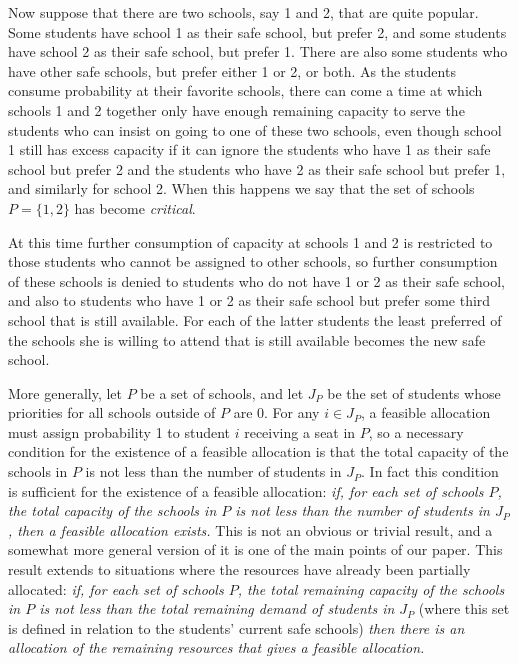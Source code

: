 \documentclass[12pt]{article}
\theoremstyle{definition}
\begin{document}
Now suppose that there are two schools, say 1 and 2, that are quite
popular.  Some students have school 1 as their safe school, but prefer
2, and some students have school 2 as their safe school, but prefer 1.
There are also some students who have other safe schools, but prefer
either 1 or 2, or both.  As the students consume probability at their
favorite schools, there can come a time at which schools 1 and 2
together only have enough remaining capacity to serve the students who
can insist on going to one of these two schools, even though school 1
still has excess capacity if it can ignore the students who have 1 as
their safe school but prefer 2 and the students who have 2 as their
safe school but prefer 1, and similarly for school 2.  When this
happens we say that the set of schools $P = \{1,2\}$ has become
\emph{critical}.

At this time further consumption of capacity at schools 1 and 2 is
restricted to those students who cannot be assigned to other schools,
so further consumption of these schools is denied to students who do
not have 1 or 2 as their safe school, and also to students who have 1
or 2 as their safe school but prefer some third school that is still
available.  For each of the latter students the least preferred of the
schools she is willing to attend that is still available becomes the
new safe school.

More generally, let $P$ be a set of schools, and let $J_P$ be the set
of students whose priorities for all schools outside of $P$ are 0.
For any $i \in J_P$, a feasible allocation must assign probability 1
to student $i$ receiving a seat in $P$, so a necessary condition for
the existence of a feasible allocation is that the total capacity of
the schools in $P$ is not less than the number of students in $J_P$.
In fact this condition is sufficient for the existence of a feasible
allocation: \emph{if, for each set of schools $P$, the total capacity
  of the schools in $P$ is not less than the number of students in
  $J_P$, then a feasible allocation exists.}  This is not an obvious
or trivial result, and a somewhat more general version of it is one of
the main points of our paper.  This result extends to situations where
the resources have already been partially allocated: \emph{if, for
  each set of schools $P$, the total remaining capacity of the schools
  in $P$ is not less than the total remaining demand of students in
  $J_P$} (where this set is defined in relation to the students'
current safe schools) \emph{then there is an allocation of the
  remaining resources that gives a feasible allocation.}
\end{document}
